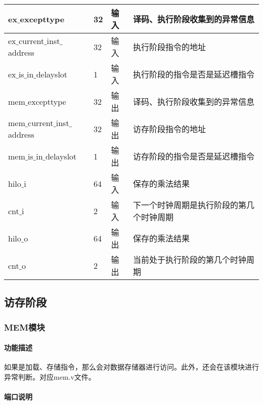 \begin{table}[H]
	\centering
	\begin{tabular}{|l|l|l|l|}
		\hline
		ex$\_$excepttype & 32 & 输入 & 译码、执行阶段收集到的异常信息 \\
		\hline
		ex$\_$current$\_$inst$\_$address & 32 & 输入 & 执行阶段指令的地址 \\
		\hline
		ex$\_$is$\_$in$\_$delayslot & 1 & 输入 & 执行阶段的指令是否是延迟槽指令 \\
		\hline
		mem$\_$excepttype & 32 & 输出 & 译码、执行阶段收集到的异常信息 \\
		\hline
		mem$\_$current$\_$inst$\_$address & 32 & 输出 & 访存阶段指令的地址 \\
		\hline
		mem$\_$is$\_$in$\_$delayslot & 1 & 输出 & 访存阶段的指令是否是延迟槽指令 \\
		\hline
		hilo$\_$i & 64 & 输入 & 保存的乘法结果 \\
		\hline
		cnt$\_$i & 2 & 输入 & 下一个时钟周期是执行阶段的第几个时钟周期 \\
		\hline
		hilo$\_$o & 64 & 输出 & 保存的乘法结果 \\
		\hline
		cnt$\_$o & 2 & 输出 & 当前处于执行阶段的第几个时钟周期 \\
		\hline
	\end{tabular}
\end{table}
\subsection{访存阶段}
\subsubsection{MEM模块}
\paragraph{功能描述}
\quad

\quad

如果是加载、存储指令，那么会对数据存储器进行访问。此外，还会在该模块进行异常判断。对应mem.v文件。
\paragraph{端口说明}
\quad

